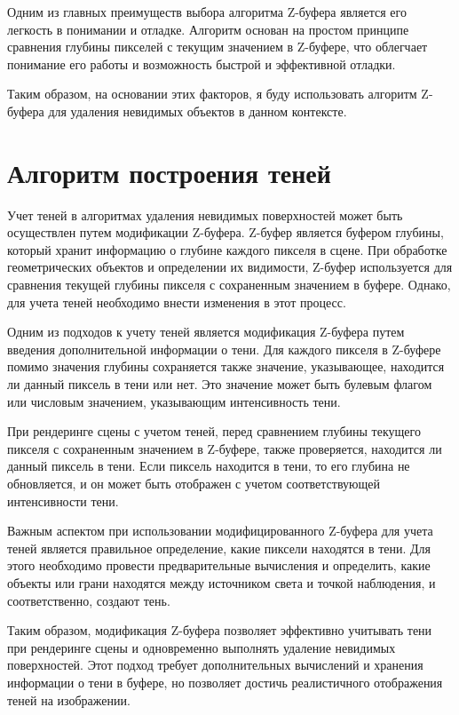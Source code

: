 Одним из главных преимуществ выбора алгоритма Z-буфера является его легкость в понимании и отладке. Алгоритм основан на простом принципе сравнения глубины пикселей с текущим значением в Z-буфере, что облегчает понимание его работы и возможность быстрой и эффективной отладки.

Таким образом, на основании этих факторов, я буду использовать алгоритм Z-буфера для удаления невидимых объектов в данном контексте.


\section{Алгоритм построения теней}

Учет теней в алгоритмах удаления невидимых поверхностей может быть осуществлен путем модификации Z-буфера. Z-буфер является буфером глубины, который хранит информацию о глубине каждого пикселя в сцене. При обработке геометрических объектов и определении их видимости, Z-буфер используется для сравнения текущей глубины пикселя с сохраненным значением в буфере. Однако, для учета теней необходимо внести изменения в этот процесс.

Одним из подходов к учету теней является модификация Z-буфера путем введения дополнительной информации о тени. Для каждого пикселя в Z-буфере помимо значения глубины сохраняется также значение, указывающее, находится ли данный пиксель в тени или нет. Это значение может быть булевым флагом или числовым значением, указывающим интенсивность тени.

При рендеринге сцены с учетом теней, перед сравнением глубины текущего пикселя с сохраненным значением в Z-буфере, также проверяется, находится ли данный пиксель в тени. Если пиксель находится в тени, то его глубина не обновляется, и он может быть отображен с учетом соответствующей интенсивности тени.

Важным аспектом при использовании модифицированного Z-буфера для учета теней является правильное определение, какие пиксели находятся в тени. Для этого необходимо провести предварительные вычисления и определить, какие объекты или грани находятся между источником света и точкой наблюдения, и соответственно, создают тень.

Таким образом, модификация Z-буфера позволяет эффективно учитывать тени при рендеринге сцены и одновременно выполнять удаление невидимых поверхностей. Этот подход требует дополнительных вычислений и хранения информации о тени в буфере, но позволяет достичь реалистичного отображения теней на изображении.